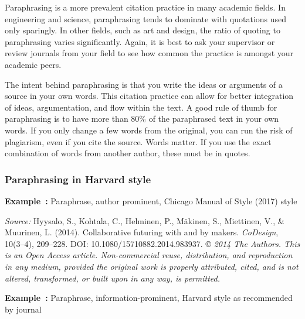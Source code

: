 \documentclass[english, 12pt, a4paper, biz, utf8, a-2b, online]{aaltothesis}
\begin{document}
Paraphrasing is a more prevalent citation practice in many academic fields. In 
engineering and science, paraphrasing tends to dominate with quotations used 
only sparingly. In other fields, such as art and design, the ratio of quoting to
paraphrasing varies significantly. Again, it is best to ask your supervisor or 
review journals from your field to see how common the practice is amongst your 
academic peers.

The intent behind paraphrasing is that you write the ideas or arguments of a 
source in your own words. This citation practice can allow for better 
integration of ideas, argumentation, and flow within the text. A good rule of 
thumb for paraphrasing is to have more than 80\% of the paraphrased text in your
own words. If you only change a few words from the original, you can run the 
risk of plagiarism, even if you cite the source. Words matter. If you use the 
exact combination of words from another author, these must be in quotes.


\subsubsection*{Paraphrasing in Harvard style}

\textsf{\textbf{Example~\theexample:}} Paraphrase, author prominent, Chicago 
Manual of Style (2017) style

\vspace{1ex}
\noindent
{}

\vspace{1ex}
\noindent
\textit{Source:} Hyysalo, S., Kohtala, C., Helminen, P., Mäkinen, S., Miettinen,
V., \& Muurinen, L. (2014). Collaborative futuring with and by makers. 
\textit{CoDesign}, 10(3--4), 209--228. DOI: 10.1080/15710882.2014.983937. 
\copyright{}
\textit{2014 The Authors. This is an Open Access article. Non-commercial reuse, 
	distribution, and reproduction in any medium, provided the original work is 
	properly attributed, cited, and is not altered, transformed, or built upon 
	in any way, is permitted.}

\vspace{1em}
\noindent
{}
\textsf{\textbf{Example~\theexample:}} Paraphrase, information-prominent, 
Harvard style as recommended by journal
\end{document}
